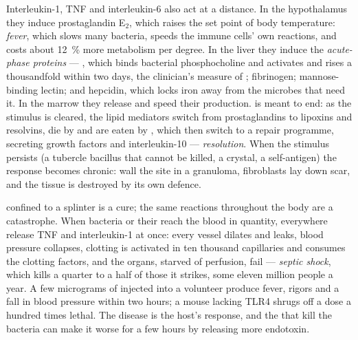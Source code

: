 \begin{proposition}\label{prop:b3:innate-immunity:systemic}
Interleukin-1, TNF and interleukin-6 also act at a distance. In the
hypothalamus they induce prostaglandin E$_{2}$, which raises the set
point of body temperature: \emph{fever}, which slows many bacteria,
speeds the immune cells' own reactions, and costs about \qty{12}{\%}
more metabolism per degree. In the liver they induce the
\emph{acute-phase proteins} --- , which binds
bacterial phosphocholine and activates  and rises a
thousandfold within two days, the clinician's measure of ;
fibrinogen; mannose-binding lectin; and hepcidin, which locks iron away
from the microbes that need it. In the marrow they release 
and speed their production.  is meant to end: as the
stimulus is cleared, the lipid mediators switch from prostaglandins to
lipoxins and resolvins,  die by  and are eaten by
, which then switch to a repair programme, secreting growth
factors and interleukin-10 --- \emph{resolution}. When the stimulus
persists (a tubercle bacillus that cannot be killed, a crystal, a
self-antigen) the response becomes chronic:  wall the site
in a granuloma, fibroblasts lay down scar, and the tissue is destroyed
by its own defence.
\end{proposition}

\begin{example}[Sepsis]\label{ex:b3:innate-immunity:sepsis}
 confined to a splinter is a cure; the same reactions
throughout the body are a catastrophe. When bacteria or their
 reach the blood in quantity,  everywhere
release TNF and interleukin-1 at once: every vessel dilates and leaks,
blood pressure collapses, clotting is activated in ten thousand
capillaries and consumes the clotting factors, and the organs, starved
of perfusion, fail --- \emph{septic shock}, which kills a quarter to a
half of those it strikes, some eleven million people a year. A few
micrograms of  injected into a volunteer produce
fever, rigors and a fall in blood pressure within two hours; a mouse
lacking TLR4 shrugs off a dose a hundred times lethal. The disease is
the host's response, and the  that kill the bacteria can
make it worse for a few hours by releasing more endotoxin.
\end{example}

